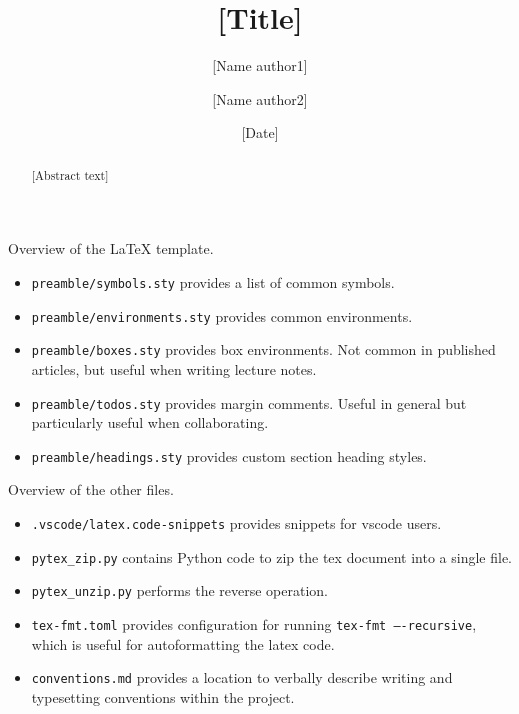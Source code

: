 \documentclass[twoside,reqno,11pt,dvipsnames]{amsart}
\title{[Title]}
\author{[Name author1]}
\author{[Name author2]}
\date{[Date]}
\begin{document}
\begin{abstract}
    [Abstract text]
\end{abstract}
\maketitle



Overview of the LaTeX template.

\begin{itemize}
    \item \texttt{preamble/symbols.sty} provides a list of common symbols.
    \item \texttt{preamble/environments.sty} provides common environments.
    \item \texttt{preamble/boxes.sty} provides box environments.
        Not common in published articles, but useful when writing lecture notes.
    \item \texttt{preamble/todos.sty} provides margin comments.
        Useful in general but particularly useful when collaborating.
    \item \texttt{preamble/headings.sty} provides custom section heading styles.
\end{itemize}

Overview of the other files.

\begin{itemize}
    \item \texttt{.vscode/latex.code-snippets} provides snippets for vscode users.
    \item \texttt{pytex\_zip.py} contains Python code to zip the tex document into a single file.
    \item \texttt{pytex\_unzip.py} performs the reverse operation.
    \item \texttt{tex-fmt.toml} provides configuration for running \texttt{tex-fmt ----recursive},
        which is useful for autoformatting the latex code.
    \item \texttt{conventions.md} provides a location to verbally describe writing and
        typesetting conventions within the project.
\end{itemize}
\end{document}

